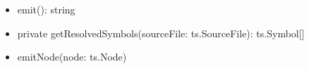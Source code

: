 





\begin{itemize}
  \item emit(): string
  \item private getResolvedSymbols(sourceFile: ts.SourceFile): ts.Symbol[]
  \item emitNode(node: ts.Node)
\end{itemize}
